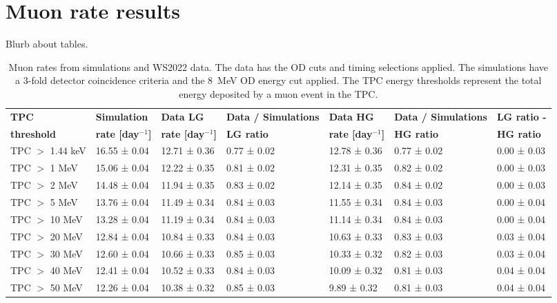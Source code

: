 \section{Muon rate results}\label{sec:app/MuonRates}
Blurb about tables.
\begin{landscape}
\begin{table}[ht!]
    \centering
    \caption[Muon rates from simulations and WS2022 data.]{Muon rates from simulations and WS2022 data. The data has the OD cuts and timing selections applied. The simulations have a 3-fold detector coincidence criteria and the 8~MeV OD energy cut applied. The TPC energy thresholds represent the total energy deposited by a muon event in the TPC.}
    \begin{tabular}{lllllll}
    \hline\hline
    \textbf{TPC} & \textbf{Simulation} & \textbf{Data LG} & \textbf{Data / Simulations} & \textbf{Data HG} & \textbf{Data / Simulations} & \textbf{LG ratio -} \\
    \textbf{threshold} & \textbf{rate [day$^{-1}$]} & \textbf{rate [day$^{-1}$]} & \textbf{LG ratio} & \textbf{rate [day$^{-1}$]} & \textbf{HG ratio} & \textbf{HG ratio} \\
    \hline
    TPC $>$ 1.44 keV &  16.55 ± 0.04 &  12.71 ± 0.36 & 0.77 ± 0.02  &  12.78 ± 0.36 & 0.77 ± 0.02  & 0.00 ± 0.03 \\ 
    TPC $>$ 1 MeV &  15.06 ± 0.04 &  12.22 ± 0.35 & 0.81 ± 0.02  &  12.31 ± 0.35 & 0.82 ± 0.02  & 0.00 ± 0.03 \\
    TPC $>$ 2 MeV &  14.48 ± 0.04 &  11.94 ± 0.35 & 0.83 ± 0.02  &  12.14 ± 0.35 & 0.84 ± 0.02  & 0.00 ± 0.03 \\
    TPC $>$ 5 MeV &  13.76 ± 0.04 &  11.49 ± 0.34 & 0.84 ± 0.03  &  11.55 ± 0.34 & 0.84 ± 0.03  & 0.00 ± 0.04 \\
    TPC $>$ 10 MeV &  13.28 ± 0.04 &  11.19 ± 0.34 & 0.84 ± 0.03 &  11.14 ± 0.34 & 0.84 ± 0.03  & 0.00 ± 0.04 \\
    TPC $>$ 20 MeV &  12.84 ± 0.04 &  10.84 ± 0.33 & 0.84 ± 0.03  &  10.63 ± 0.33 & 0.83 ± 0.03  & 0.03 ± 0.04 \\
    TPC $>$ 30 MeV &  12.60 ± 0.04 &  10.66 ± 0.33 & 0.85 ± 0.03  &  10.33 ± 0.32 & 0.82 ± 0.03  & 0.03 ± 0.04 \\
    TPC $>$ 40 MeV &  12.41 ± 0.04 &  10.52 ± 0.33 & 0.84 ± 0.03  &  10.09 ± 0.32 & 0.81 ± 0.03  & 0.04 ± 0.04 \\
    TPC $>$ 50 MeV &  12.26 ± 0.04 &  10.38 ± 0.32 & 0.85 ± 0.03  &   9.89 ± 0.32 & 0.81 ± 0.03  & 0.04 ± 0.04 \\

\end{tabular}
\end{table}
\end{landscape}
